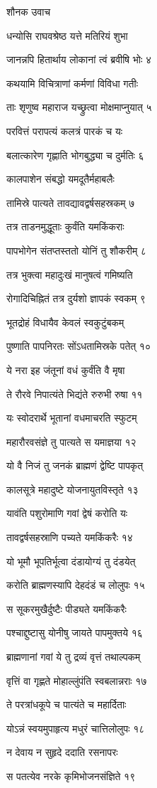 शौनक उवाच

धन्योसि राघवश्रेष्ठ यत्ते मतिरियं शुभा

जानन्नपि हितार्थाय लोकानां त्वं ब्रवीषि भोः ४

कथयामि विचित्राणां कर्मणां विविधा गतीः

ताः शृणुष्व महाराज यच्छ्रुत्वा मोक्षमाप्नुयात् ५

परवित्तं परापत्यं कलत्रं पारकं च यः

बलात्कारेण गृह्णाति भोगबुद्ध्या च दुर्मतिः ६

कालपाशेन संबद्धो यमदूतैर्महाबलैः

तामिस्रे पात्यते तावद्यावद्वर्षसहस्रकम् ७

तत्र ताडनमुद्धूताः कुर्वंति यमकिंकराः

पापभोगेन संतप्तस्ततो योनिं तु शौकरीम् ८

तत्र भुक्त्वा महादुःखं मानुषत्वं गमिष्यति

रोगादिचिह्नितं तत्र दुर्यशो ज्ञापकं स्वकम् ९

भूतद्रोहं विधायैव केवलं स्वकुटुंबकम्

पुष्णाति पापनिरतः सोंऽधतामिस्रके पतेत् १०

ये नरा इह जंतूनां वधं कुर्वंति वै मृषा

ते रौरवे निपात्यंते भिद्यंते रुरुभी रुषा ११

यः स्वोदरार्थे भूतानां वधमाचरति स्फुटम्

महारौरवसंज्ञे तु पात्यते स यमाज्ञया १२

यो वै निजं तु जनकं ब्राह्मणं द्वेष्टि पापकृत्

कालसूत्रे महादुष्टे योजनायुतविस्तृते १३

यावंति पशुरोमाणि गवां द्वेषं करोति यः

तावद्वर्षसहस्राणि पच्यते यमकिंकरैः १४

यो भूमौ भूपतिर्भूत्वा दंडायोग्यं तु दंडयेत्

करोति ब्राह्मणस्यापि देहदंडं च लोलुपः १५

स सूकरमुखैर्दुष्टैः पीड्यते यमकिंकरैः

पश्चाद्दुष्टासु योनीषु जायते पापमुक्तये १६

ब्राह्मणानां गवां ये तु द्रव्यं वृत्तं तथाल्पकम्

वृत्तिं वा गृह्णते मोहाल्लुंपंति स्वबलान्नराः १७

ते परत्रांधकूपे च पात्यंते च महार्दिताः

योऽन्नं स्वयमुपाहृत्य मधुरं चात्तिलोलुपः १८

न देवाय न सुहृदे ददाति रसनापरः

स पतत्येव नरके कृमिभोजनसंज्ञिते १९

